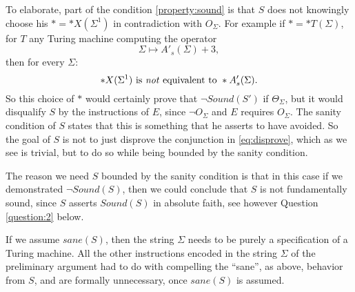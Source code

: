 \documentclass[9pt,twocolumn,twoside,lineno]{pnas-new}
\numberwithin{equation}{section}
\theoremstyle{definition}
\theoremstyle{remark}
\begin{document}
To elaborate, part of the condition \ref{property:sound} is that $S$ does not knowingly choose his $*= * X (\Sigma ^{1} )$ in contradiction with $O _{\Sigma} $. For example if $* = *T (\Sigma)$, for $T$ any Turing machine computing the operator $$\Sigma \mapsto A' _{s} (\Sigma)+3, $$ then 
   for every $\Sigma$: $$*X (\Sigma ^{1} ) \text{ is \emph{not} equivalent to }   *A' _{s} (\Sigma).
   $$ So this choice of $*$ would certainly prove that $\neg Sound (S')$ if $\Theta _{\Sigma} $, but it would disqualify $S$ by the instructions of $E$, since $\neg O _{\Sigma}  $ and $E$ requires $O _{\Sigma} $.
The sanity condition of $S$ states that this is something that he asserts to have avoided.  So the goal of $S$ is not to just disprove the conjunction in \eqref{eq:disprove}, which as we see is trivial,  but to do so while being bounded by the sanity condition. 

The reason we need $S$ bounded by the sanity condition is that in this case 
if we demonstrated $\neg Sound (S)$, then we could conclude that $S$ is not fundamentally sound, since $S$ asserts $Sound (S)$ in absolute faith, see however Question \ref{question:2} below.
 


If we assume  $sane (S)$, then the string $\Sigma$ needs to be purely a specification of a Turing machine. All the other instructions encoded in the string $\Sigma$ of the preliminary argument had to do with compelling the ``sane'', as above, behavior from $S$, and are formally unnecessary, once $sane (S)$ is assumed.
\end{document}
